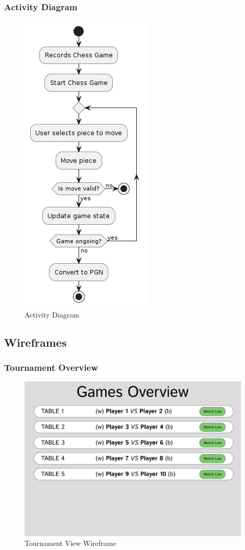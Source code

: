\subsubsection*{Activity Diagram}
\label{subsubsec:activity-diagram}

\begin{figure}[h!]
    \centering
    \includegraphics[height=0.75\linewidth]{figures/uml/activity.png}
    \caption[Activity Diagram]{Activity Diagram}
    \label{fig:activity}
\end{figure}

\subsection{Wireframes}
\label{subsec:wireframe}

\subsubsection*{Tournament Overview}
\label{subsubsec:tournament-overview}

\begin{figure}[h!]
    \centering
    \includegraphics[width=0.75\linewidth]{figures/wireframe/overview.png}
    \caption[Tournament View Wireframe]{Tournament View Wireframe}
    \label{fig:app-overview}
\end{figure}

